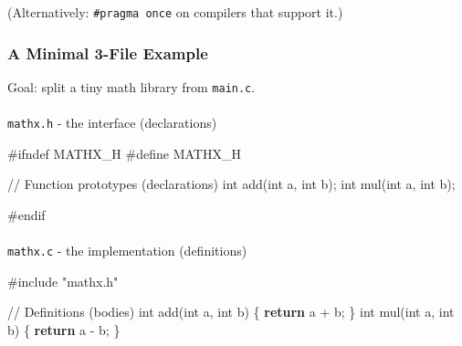 \documentclass[
  letterpaper,
  DIV=11,
  numbers=noendperiod]{scrreprt}
\makeatletter
\let\oldparagraph\paragraph
\renewcommand{\paragraph}{
    \@ifstar
      \xxxParagraphStar
      \xxxParagraphNoStar
  }
\newcommand{\xxxParagraphStar}[1]{\oldparagraph*{#1}\mbox{}}
\newcommand{\xxxParagraphNoStar}[1]{\oldparagraph{#1}\mbox{}}
\newenvironment{Shaded}{\begin{snugshade}}{\end{snugshade}}
\newcommand{\CommentTok}[1]{\textcolor[rgb]{0.37,0.37,0.37}{#1}}
\newcommand{\ControlFlowTok}[1]{\textcolor[rgb]{0.00,0.23,0.31}{\textbf{#1}}}
\newcommand{\DataTypeTok}[1]{\textcolor[rgb]{0.68,0.00,0.00}{#1}}
\newcommand{\ImportTok}[1]{\textcolor[rgb]{0.00,0.46,0.62}{#1}}
\newcommand{\NormalTok}[1]{\textcolor[rgb]{0.00,0.23,0.31}{#1}}
\newcommand{\OperatorTok}[1]{\textcolor[rgb]{0.37,0.37,0.37}{#1}}
\newcommand{\PreprocessorTok}[1]{\textcolor[rgb]{0.68,0.00,0.00}{#1}}
\makeatother
\begin{document}
(Alternatively: \texttt{\#pragma\ once} on compilers that support it.)

\subsubsection{A Minimal 3-File Example}\label{a-minimal-3-file-example}

Goal: split a tiny math library from \texttt{main.c}.

\paragraph{\texorpdfstring{\texttt{mathx.h} - the interface
(declarations)}{mathx.h - the interface (declarations)}}\label{mathx.h---the-interface-declarations}

\begin{Shaded}
\begin{Highlighting}[]
\PreprocessorTok{\#ifndef MATHX\_H}
\PreprocessorTok{\#define MATHX\_H}

\CommentTok{// Function prototypes (declarations)}
\DataTypeTok{int}\NormalTok{ add}\OperatorTok{(}\DataTypeTok{int}\NormalTok{ a}\OperatorTok{,} \DataTypeTok{int}\NormalTok{ b}\OperatorTok{);}
\DataTypeTok{int}\NormalTok{ mul}\OperatorTok{(}\DataTypeTok{int}\NormalTok{ a}\OperatorTok{,} \DataTypeTok{int}\NormalTok{ b}\OperatorTok{);}

\PreprocessorTok{\#endif}
\end{Highlighting}
\end{Shaded}

\paragraph{\texorpdfstring{\texttt{mathx.c} - the implementation
(definitions)}{mathx.c - the implementation (definitions)}}\label{mathx.c---the-implementation-definitions}

\begin{Shaded}
\begin{Highlighting}[]
\PreprocessorTok{\#include }\ImportTok{"mathx.h"}

\CommentTok{// Definitions (bodies)}
\DataTypeTok{int}\NormalTok{ add}\OperatorTok{(}\DataTypeTok{int}\NormalTok{ a}\OperatorTok{,} \DataTypeTok{int}\NormalTok{ b}\OperatorTok{)} \OperatorTok{\{} \ControlFlowTok{return}\NormalTok{ a }\OperatorTok{+}\NormalTok{ b}\OperatorTok{;} \OperatorTok{\}}
\DataTypeTok{int}\NormalTok{ mul}\OperatorTok{(}\DataTypeTok{int}\NormalTok{ a}\OperatorTok{,} \DataTypeTok{int}\NormalTok{ b}\OperatorTok{)} \OperatorTok{\{} \ControlFlowTok{return}\NormalTok{ a }\OperatorTok{{-}}\NormalTok{ b}\OperatorTok{;} \OperatorTok{\}}
\end{Highlighting}
\end{Shaded}
\end{document}

